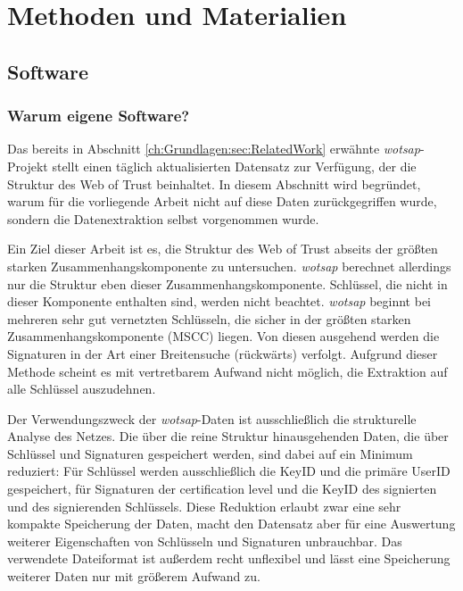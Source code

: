 
\chapter{Methoden und Materialien}
\label{ch:Methoden}

\section{Software}
\label{sec:software}


\subsection{Warum eigene Software?}
\label{ch:Grundlagen:sec:WarumEigene}
Das bereits in Abschnitt \ref{ch:Grundlagen:sec:RelatedWork} erwähnte
\emph{wotsap}-Projekt stellt einen täglich aktualisierten Datensatz
zur Verfügung, der die Struktur des Web of Trust beinhaltet. In
diesem Abschnitt wird begründet, warum für die vorliegende Arbeit
nicht auf diese Daten zurückgegriffen wurde, sondern die
Datenextraktion selbst vorgenommen wurde.

Ein Ziel dieser Arbeit ist es, die Struktur des Web of Trust abseits
der größten starken Zusammenhangskomponente zu
untersuchen. \emph{wotsap} berechnet allerdings nur die Struktur eben
dieser Zusammenhangskomponente. Schlüssel, die nicht in dieser
Komponente enthalten sind, werden nicht beachtet. \emph{wotsap}
beginnt bei mehreren sehr gut vernetzten Schlüsseln, die sicher in der
gr\"o{\ss}ten starken Zusammenhangskomponente (MSCC) liegen. Von diesen ausgehend werden die Signaturen in der Art
einer Breitensuche (rückwärts) verfolgt. Aufgrund dieser Methode
scheint es mit vertretbarem Aufwand nicht möglich, die Extraktion auf
alle Schlüssel auszudehnen.

Der Verwendungszweck der \emph{wotsap}-Daten ist ausschließlich die
strukturelle Analyse des Netzes. Die über die reine Struktur
hinausgehenden Daten, die über Schlüssel und Signaturen gespeichert
werden, sind dabei auf ein Minimum reduziert: Für Schlüssel werden
ausschließlich die KeyID und die primäre UserID gespeichert, für
Signaturen der certification level und die KeyID des signierten und
des signierenden Schlüssels. Diese Reduktion erlaubt zwar eine sehr
kompakte Speicherung der Daten, macht den Datensatz aber für eine
Auswertung weiterer Eigenschaften von Schlüsseln und Signaturen
unbrauchbar. Das verwendete Dateiformat ist außerdem recht unflexibel
und lässt eine Speicherung weiterer Daten nur mit größerem Aufwand
zu.

